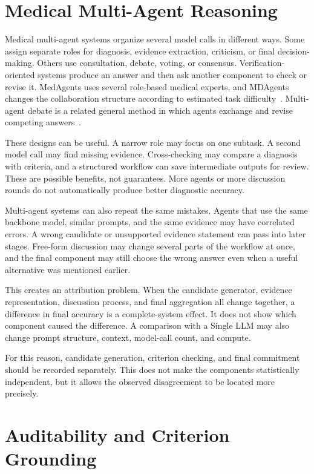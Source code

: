 \section{Medical Multi-Agent Reasoning}

Medical multi-agent systems organize several model calls in different ways. Some assign separate roles for diagnosis, evidence extraction, criticism, or final decision-making. Others use consultation, debate, voting, or consensus. Verification-oriented systems produce an answer and then ask another component to check or revise it. MedAgents uses several role-based medical experts, and MDAgents changes the collaboration structure according to estimated task difficulty~\citep{tang2024medagents,kim2024mdagents}. Multi-agent debate is a related general method in which agents exchange and revise competing answers~\citep{du2024debate}.

These designs can be useful. A narrow role may focus on one subtask. A second model call may find missing evidence. Cross-checking may compare a diagnosis with criteria, and a structured workflow can save intermediate outputs for review. These are possible benefits, not guarantees. More agents or more discussion rounds do not automatically produce better diagnostic accuracy.

Multi-agent systems can also repeat the same mistakes. Agents that use the same backbone model, similar prompts, and the same evidence may have correlated errors. A wrong candidate or unsupported evidence statement can pass into later stages. Free-form discussion may change several parts of the workflow at once, and the final component may still choose the wrong answer even when a useful alternative was mentioned earlier.

This creates an attribution problem. When the candidate generator, evidence representation, discussion process, and final aggregation all change together, a difference in final accuracy is a complete-system effect. It does not show which component caused the difference. A comparison with a Single LLM may also change prompt structure, context, model-call count, and compute.

For this reason, candidate generation, criterion checking, and final commitment should be recorded separately. This does not make the components statistically independent, but it allows the observed disagreement to be located more precisely.

\section{Auditability and Criterion Grounding}
\label{sec:auditability-definition}

